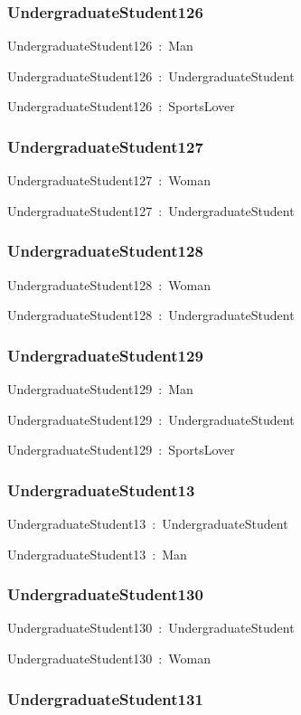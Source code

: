 \documentclass{article}
\begin{document}
\subsubsection*{UndergraduateStudent126}

UndergraduateStudent126~:~Man

UndergraduateStudent126~:~UndergraduateStudent

UndergraduateStudent126~:~SportsLover

\subsubsection*{UndergraduateStudent127}

UndergraduateStudent127~:~Woman

UndergraduateStudent127~:~UndergraduateStudent

\subsubsection*{UndergraduateStudent128}

UndergraduateStudent128~:~Woman

UndergraduateStudent128~:~UndergraduateStudent

\subsubsection*{UndergraduateStudent129}

UndergraduateStudent129~:~Man

UndergraduateStudent129~:~UndergraduateStudent

UndergraduateStudent129~:~SportsLover

\subsubsection*{UndergraduateStudent13}

UndergraduateStudent13~:~UndergraduateStudent

UndergraduateStudent13~:~Man

\subsubsection*{UndergraduateStudent130}

UndergraduateStudent130~:~UndergraduateStudent

UndergraduateStudent130~:~Woman

\subsubsection*{UndergraduateStudent131}
\end{document}
